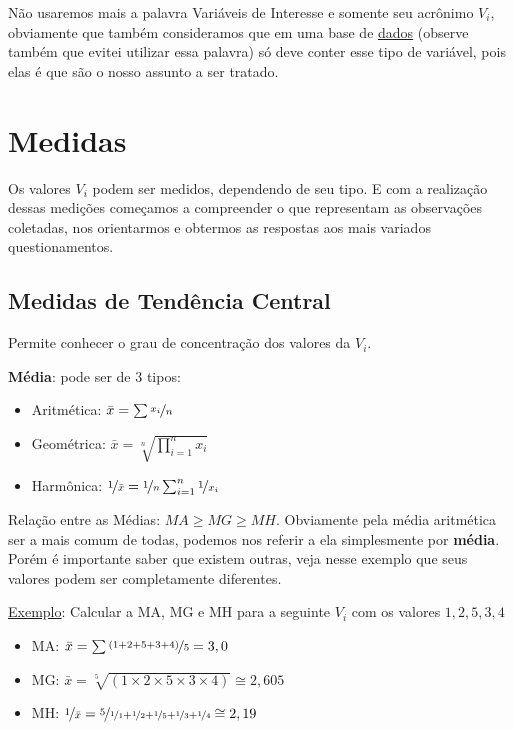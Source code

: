 \documentclass[a4paper,11pt]{article}
\begin{document}
\begin{theo}{}
	Não usaremos mais a palavra Variáveis de Interesse e somente seu acrônimo $V_{i}$, obviamente que também consideramos que em uma base de \underline{dados} (observe também que evitei utilizar essa palavra) só deve conter esse tipo de variável, pois elas é que são o nosso assunto a ser tratado.
\end{theo}

\section{Medidas}
Os valores $V_{i}$ podem ser medidos, dependendo de seu tipo. E com a realização dessas medições começamos a compreender o que representam as observações coletadas, nos orientarmos e obtermos as respostas aos mais variados questionamentos.

\subsection{Medidas de Tendência Central}
Permite conhecer o grau de concentração dos valores da $V_{i}$.

\textbf{Média}: pode ser de 3 tipos: \vspace{-1em}
\begin{itemize}
	\item Aritmética: $\bar{x} = \sum \nicefrac{x_{i}}{n}$
	\item Geométrica: $\bar{x} = \sqrt[n]{\prod_{i=1}^n{x_{i}}}$
	\item Harmônica: $\nicefrac{1}{\bar{x}} = \nicefrac{1}{n}\sum_{i=1}^n\nicefrac{1}{x_{i}}$
\end{itemize}

Relação entre as Médias: $MA \geq MG \geq MH$. Obviamente pela média aritmética ser a mais comum de todas, podemos nos referir a ela simplesmente por \textbf{média}. Porém é importante saber que existem outras, veja nesse exemplo que seus valores podem ser completamente diferentes.

\underline{Exemplo}: Calcular a MA, MG e MH para a seguinte $V_{i}$ com os valores ${1,2,5,3,4}$ \vspace{-1em}
\begin{itemize}
	\item MA: $\bar{x} = \sum \nicefrac{(1 + 2 + 5 + 3 + 4)}{5} = 3,0$
	\item MG: $\bar{x} = \sqrt[5]{(1 \times 2 \times 5 \times 3 \times 4)} \cong 2,605$
	\item MH: $\nicefrac{1}{\bar{x}} = \nicefrac{5}{\nicefrac{1}{1} + \nicefrac{1}{2} + \nicefrac{1}{5} + \nicefrac{1}{3} + \nicefrac{1}{4}} \cong 2,19$
\end{itemize}
\end{document}

